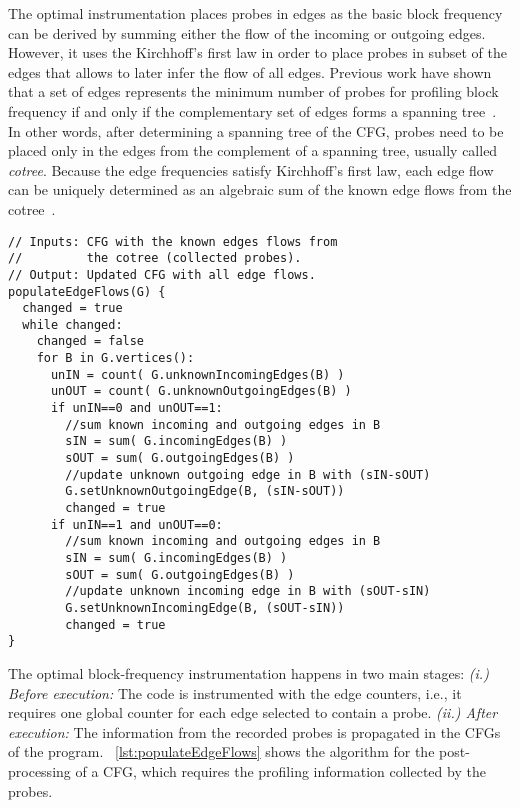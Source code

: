 The optimal instrumentation places probes in edges as the basic block frequency can be derived by summing either the flow of the incoming or outgoing edges.
However, it uses the Kirchhoff's first law in order to place probes in subset of the edges that allows to later infer the flow of all edges.
Previous work have shown that a set of edges represents the minimum number of probes for profiling block frequency if and only if the complementary set of edges forms a spanning tree~\citep{nahapetian73,ball94}.
In other words, after determining a spanning tree of the CFG, probes need to be placed only in the edges from the complement of a spanning tree, usually called \textit{cotree}.
Because the edge frequencies satisfy Kirchhoff's first law, each edge flow can be uniquely determined as an algebraic sum of the known edge flows from the cotree~\citep{nahapetian73,ball94}.

\begin{lstlisting}[caption={Post-processing of the CFG for populating all edge flows based on the collected probes.}, label={lst:populateEdgeFlows}]
// Inputs: CFG with the known edges flows from
//         the cotree (collected probes).
// Output: Updated CFG with all edge flows.
populateEdgeFlows(G) {
  changed = true
  while changed:
    changed = false
    for B in G.vertices():
      unIN = count( G.unknownIncomingEdges(B) )
      unOUT = count( G.unknownOutgoingEdges(B) )
      if unIN==0 and unOUT==1:
        //sum known incoming and outgoing edges in B
        sIN = sum( G.incomingEdges(B) )
        sOUT = sum( G.outgoingEdges(B) )
        //update unknown outgoing edge in B with (sIN-sOUT)
        G.setUnknownOutgoingEdge(B, (sIN-sOUT))
        changed = true
      if unIN==1 and unOUT==0:
        //sum known incoming and outgoing edges in B
        sIN = sum( G.incomingEdges(B) )
        sOUT = sum( G.outgoingEdges(B) )
        //update unknown incoming edge in B with (sOUT-sIN)
        G.setUnknownIncomingEdge(B, (sOUT-sIN))
        changed = true
}
\end{lstlisting}

The optimal block-frequency instrumentation happens in two main stages:
\textit{(i.) Before execution:} The code is instrumented with the edge counters, i.e., it requires one global counter for each edge selected to contain a probe.
\textit{(ii.) After execution:} The information from the recorded probes is propagated in the CFGs of the program.
\lstlistingname~\ref{lst:populateEdgeFlows} shows the algorithm for the post-processing of a CFG, which requires the profiling information collected by the probes.

